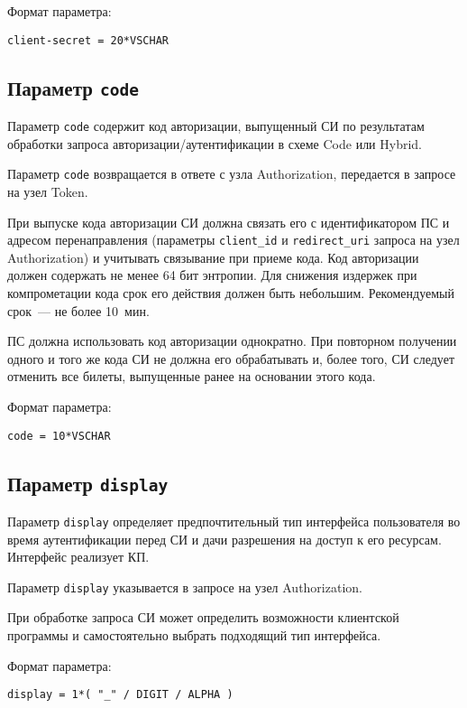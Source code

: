 Формат параметра:
\begin{lstlisting}
client-secret = 20*VSCHAR
\end{lstlisting}

\subsection{Параметр \lstinline{code}}\label{PARAMS.Code}

Параметр \lstinline{code} содержит код авторизации, выпущенный СИ
по результатам обработки запроса авторизации/аутентификации в схеме
Code или Hybrid.

Параметр \lstinline{code} возвращается в ответе с узла Authorization, 
передается в запросе на узел Token.

При выпуске кода авторизации СИ должна связать его с идентификатором ПС 
и адресом перенаправления (параметры \lstinline{client_id} и 
\lstinline{redirect_uri} запроса на узел Authorization) и учитывать 
связывание при приеме кода.
%
Код авторизации должен содержать не менее 64 бит энтропии.
%
Для снижения издержек при компрометации кода срок его действия должен быть 
небольшим.
%
Рекомендуемый срок~--- не более 10~мин.

ПС должна использовать код авторизации однократно. При повторном получении 
одного и того же кода СИ не должна его обрабатывать и, более того, СИ следует   
отменить все билеты, выпущенные ранее на основании этого кода.

Формат параметра:
\begin{lstlisting}
code = 10*VSCHAR
\end{lstlisting}

\subsection{Параметр \lstinline{display}}\label{PARAMS.Display}  

Параметр \lstinline{display} определяет предпочтительный тип интерфейса 
пользователя во время аутентификации перед СИ и дачи разрешения на доступ к его 
ресурсам. Интерфейс реализует КП.

Параметр \lstinline{display} указывается в запросе на узел Authorization.

При обработке запроса СИ может определить возможности клиентской программы и 
самостоятельно выбрать подходящий тип интерфейса.

Формат параметра:
\begin{lstlisting}
display = 1*( "_" / DIGIT / ALPHA )
\end{lstlisting}

